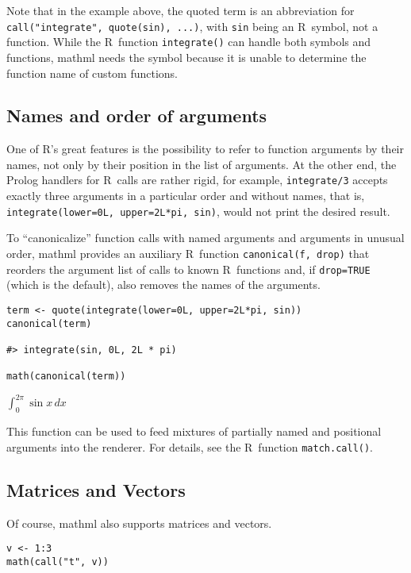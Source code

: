 Note that in the example above, the quoted term is an abbreviation for
\texttt{call("integrate",~quote(sin),~...)}, with \texttt{sin} being an R~symbol, not
a function. While the R~function \texttt{integrate()} can handle both symbols
and functions, mathml needs the symbol because it is unable to determine
the function name of custom functions.

\hypertarget{names-and-order-of-arguments}{%
\subsection{Names and order of arguments}\label{names-and-order-of-arguments}}

One of R's great features is the possibility to refer to function
arguments by their names, not only by their position in the list of
arguments. At the other end, the Prolog handlers for R~calls are rather
rigid, for example, \texttt{integrate/3} accepts exactly three arguments in a
particular order and without names, that is,
\texttt{integrate(lower=0L,~upper=2L*pi,~sin)}, would not print the desired
result.

To ``canonicalize'' function calls with named arguments and arguments in
unusual order, mathml provides an auxiliary R~function
\texttt{canonical(f,~drop)} that reorders the argument list of calls to known
R~functions and, if \texttt{drop=TRUE} (which is the default), also removes the
names of the arguments.

\begin{verbatim}
term <- quote(integrate(lower=0L, upper=2L*pi, sin))
canonical(term)

#> integrate(sin, 0L, 2L * pi)

math(canonical(term))
\end{verbatim}

\(\int_{0}^{{2}{{}}{\pi}}{\sin{x}}\,{d{x}}\)

This function can be used to feed mixtures of partially named and
positional arguments into the renderer. For details, see the R~function
\texttt{match.call()}.

\hypertarget{matrices-and-vectors}{%
\subsection{Matrices and Vectors}\label{matrices-and-vectors}}

Of course, mathml also supports matrices and vectors.

\begin{verbatim}
v <- 1:3
math(call("t", v))
\end{verbatim}

